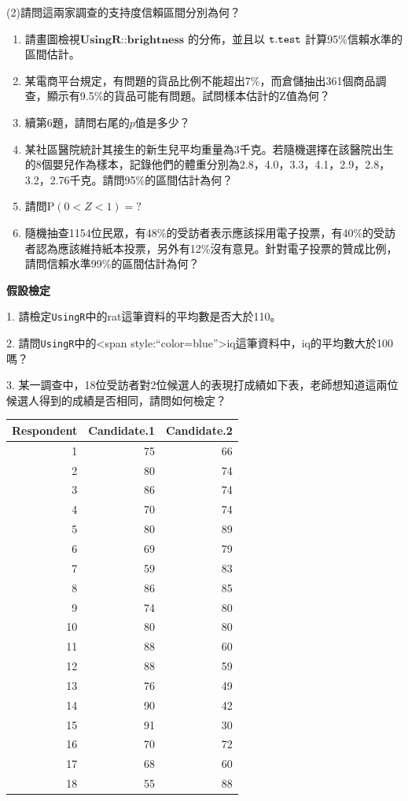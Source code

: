 \documentclass[hyperref,]{ctexart}
\begin{document}
(2)請問這兩家調查的支持度信賴區間分別為何？

\begin{enumerate}
\def\labelenumi{\arabic{enumi}.}
\setcounter{enumi}{4}
\item
  請畫圖檢視\(\textbf{UsingR::brightness}\) 的分佈，並且以
  \(\tt{t.test}\) 計算95\%信賴水準的區間估計。
\item
  某電商平台規定，有問題的貨品比例不能超出7\%，而倉儲抽出361個商品調查，顯示有9.5\%的貨品可能有問題。試問樣本估計的Z值為何？
\item
  續第6題，請問右尾的\(p\)值是多少？
\item
  某社區醫院統計其接生的新生兒平均重量為3千克。若隨機選擇在該醫院出生的8個嬰兒作為樣本，記錄他們的體重分別為2.8，4.0，3.3，4.1，2.9，2.8，3.2，2.76千克。請問95\%的區間估計為何？
\item
  請問\(\text{P}(0<Z<1)=?\)
\item
  隨機抽查1154位民眾，有48\%的受訪者表示應該採用電子投票，有40\%的受訪者認為應該維持紙本投票，另外有12\%沒有意見。針對電子投票的贊成比例，請問信賴水準99\%的區間估計為何？
\end{enumerate}

\textbf{假設檢定}

1. 請檢定\texttt{UsingR}中的rat這筆資料的平均數是否大於110。

2. 請問\texttt{UsingR}中的\textless span
style:``color=blue''\textgreater iq這筆資料中，iq的平均數大於100嗎？

3.
某一調查中，18位受訪者對2位候選人的表現打成績如下表，老師想知道這兩位候選人得到的成績是否相同，請問如何檢定？

\begin{table}[H]
\centering\begingroup\fontsize{14}{16}\selectfont

\begin{tabular}{r|r|r}
\hline
Respondent & Candidate.1 & Candidate.2\\
\hline
1 & 75 & 66\\
\hline
2 & 80 & 74\\
\hline
3 & 86 & 74\\
\hline
4 & 70 & 74\\
\hline
5 & 80 & 89\\
\hline
6 & 69 & 79\\
\hline
7 & 59 & 83\\
\hline
8 & 86 & 85\\
\hline
9 & 74 & 80\\
\hline
10 & 80 & 80\\
\hline
11 & 88 & 60\\
\hline
12 & 88 & 59\\
\hline
13 & 76 & 49\\
\hline
14 & 90 & 42\\
\hline
15 & 91 & 30\\
\hline
16 & 70 & 72\\
\hline
17 & 68 & 60\\
\hline
18 & 55 & 88\\
\hline
\end{tabular}
\endgroup{}
\end{table}
\end{document}
